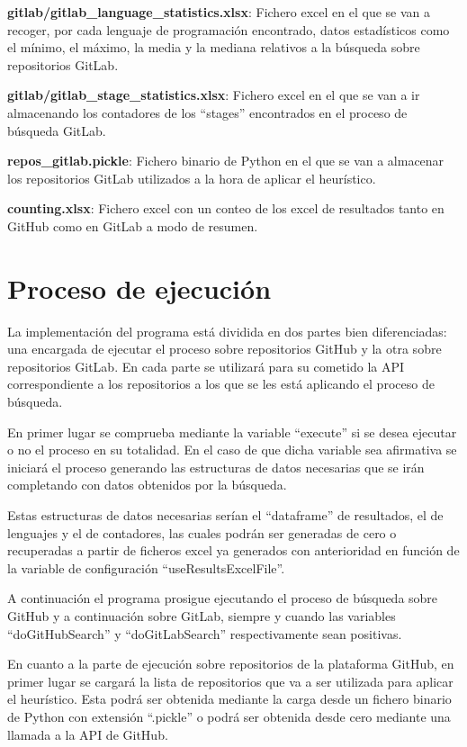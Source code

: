 \begin{compactitem}
    \item \textbf{gitlab/gitlab\_language\_statistics.xlsx}: Fichero excel en el que se van a recoger, por cada lenguaje de programación encontrado, datos estadísticos como el mínimo, el máximo, la media y la mediana relativos a la búsqueda sobre repositorios GitLab.
    \item \textbf{gitlab/gitlab\_stage\_statistics.xlsx}: Fichero excel en el que se van a ir almacenando los contadores de los ``stages'' encontrados en el proceso de búsqueda GitLab.
    \item \textbf{repos\_gitlab.pickle}: Fichero binario de Python en el que se van a almacenar los repositorios GitLab utilizados a la hora de aplicar el heurístico.
    \item \textbf{counting.xlsx}: Fichero excel con un conteo de los excel de resultados tanto en GitHub como en GitLab a modo de resumen.
\end{compactitem}

\section{Proceso de ejecución}
La implementación del programa está dividida en dos partes bien diferenciadas: una encargada de ejecutar el proceso sobre repositorios GitHub y la otra sobre repositorios GitLab. En cada parte se utilizará para su cometido la API correspondiente a los repositorios a los que se les está aplicando el proceso de búsqueda.

En primer lugar se comprueba mediante la variable ``execute'' si se desea ejecutar o no el proceso en su totalidad. En el caso de que dicha variable sea afirmativa se iniciará el proceso generando las estructuras de datos necesarias que se irán completando con datos obtenidos por la búsqueda. 

Estas estructuras de datos necesarias serían el ``dataframe'' de resultados, el de lenguajes y el de contadores, las cuales podrán ser generadas de cero o recuperadas a partir de ficheros excel ya generados con anterioridad en función de la variable de configuración ``useResultsExcelFile''.

A continuación el programa prosigue ejecutando el proceso de búsqueda sobre GitHub y a continuación sobre GitLab, siempre y cuando las variables ``doGitHubSearch'' y ``doGitLabSearch'' respectivamente sean positivas.

En cuanto a la parte de ejecución sobre repositorios de la plataforma GitHub, en primer lugar se cargará la lista de repositorios que va a ser utilizada para aplicar el heurístico. Esta podrá ser obtenida mediante la carga desde un fichero binario de Python con extensión ``.pickle'' o podrá ser obtenida desde cero mediante una llamada a la API de GitHub.

